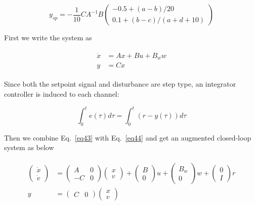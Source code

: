 \documentclass[hyperref]{article}
\theoremstyle{nonumberplain}
\begin{document}
	\begin{equation}
	y_{sp}=-\frac{1}{10}CA^{-1}B\begin{pmatrix}
	-0.5+(a-b)/20\\ 
	0.1+(b-c)/(a+d+10)
	\end{pmatrix}
	\label{eq42}
	\end{equation}
	
	First we write the system as
	
	\begin{equation}
	\begin{split}
	\begin{aligned}
	\dot{x}&=Ax+Bu+B_{w}w\\
	y&=Cx
	\end{aligned}
	\end{split}
	\label{eq43}
	\end{equation}
	
	Since both the setpoint signal and disturbance are step type, an integrator controller is induced to each channel:
	
	\begin{equation}
	\int_{0}^{t}e(\tau )d\tau = \int_{0}^{t}(r-y(\tau))d\tau 
	\label{eq44}
	\end{equation}
	
	Then we combine Eq.~\ref{eq43} with Eq.~\ref{eq44} and get an augmented closed-loop system as below
	
	\begin{equation}
	\begin{split}
	\begin{aligned}
	\begin{pmatrix}
	\dot{x}\\ 
	\dot{v}
	\end{pmatrix}&=\begin{pmatrix}
	A &0 \\ 
	-C & 0
	\end{pmatrix}\begin{pmatrix}
	x\\ 
	v
	\end{pmatrix}+\begin{pmatrix}
	B\\ 
	0
	\end{pmatrix}u+\begin{pmatrix}
	B_{w}\\ 
	0
	\end{pmatrix}w+\begin{pmatrix}
	0\\ 
	I
	\end{pmatrix}r\\
	y&=\begin{pmatrix}
	C &0 
	\end{pmatrix}\begin{pmatrix}
	x\\ 
	v
	\end{pmatrix}
	\end{aligned}
	\end{split}
	\label{eq45}
	\end{equation}
	
\end{document}
